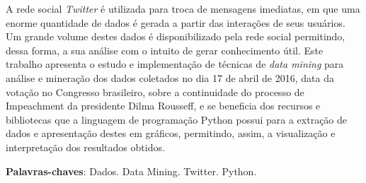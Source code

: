\begin{resumo}[RESUMO]	
A rede social \textit{Twitter} é utilizada para troca de mensagens imediatas, em que uma enorme quantidade de dados é gerada a partir das interações de seus usuários. Um grande volume destes dados é disponibilizado pela rede social permitindo, dessa forma, a sua análise com o intuito de gerar conhecimento útil. Este trabalho apresenta o estudo e implementação de técnicas de \textit{data mining} para análise e mineração dos dados coletados no dia 17 de abril de 2016, data da votação no Congresso brasileiro, sobre a continuidade do processo de Impeachment da presidente Dilma Rousseff, e se beneficia dos recursos e bibliotecas que a linguagem de programação Python possui para a extração de dados e apresentação  destes em gráficos, permitindo, assim, a visualização e interpretação dos resultados obtidos. 

 \vspace{\onelineskip}
    
 \noindent
 \textbf{Palavras-chaves}: Dados. Data Mining. Twitter. Python.
\end{resumo}
